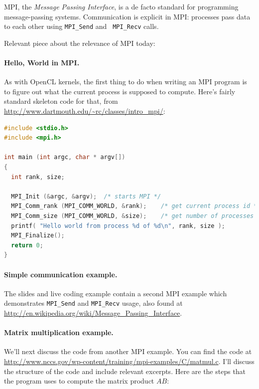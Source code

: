\documentclass[a4paper]{report}
\begin{document}
MPI, the \emph{Message Passing Interface}, is a de facto standard for
programming message-passing systems. Communication is explicit in MPI:
processes pass data to each other using {\tt MPI\_Send} and {\tt
  MPI\_Recv} calls. 

Relevant piece about the relevance of MPI today:~\cite{hpcmpi}

\paragraph{Hello, World in MPI.} As with OpenCL kernels,
the first thing to do when writing an MPI program is to
figure out what the current process is supposed to compute.
Here's fairly standard skeleton code for that,
from \url{http://www.dartmouth.edu/~rc/classes/intro_mpi/}:

{\small
\begin{lstlisting}[language=C]
#include <stdio.h>
#include <mpi.h>

int main (int argc, char * argv[])
{
  int rank, size;

  MPI_Init (&argc, &argv);	/* starts MPI */
  MPI_Comm_rank (MPI_COMM_WORLD, &rank);	/* get current process id */
  MPI_Comm_size (MPI_COMM_WORLD, &size);	/* get number of processes */
  printf( "Hello world from process %d of %d\n", rank, size );
  MPI_Finalize();
  return 0;
}
\end{lstlisting}
}

\paragraph{Simple communication example.} The slides and live coding example contain
a second MPI example which demonstrates {\tt MPI\_Send} and  {\tt MPI\_Recv} usage,
also found at \url{http://en.wikipedia.org/wiki/Message_Passing_Interface}.

\paragraph{Matrix multiplication example.} We'll next discuss the code 
from another MPI example. You can find the code at
\url{http://www.nccs.gov/wp-content/training/mpi-examples/C/matmul.c}.
I'll discuss the structure of the code and
include relevant excerpts. Here are the steps that the program uses
to compute the matrix product $AB$:
\end{document}
